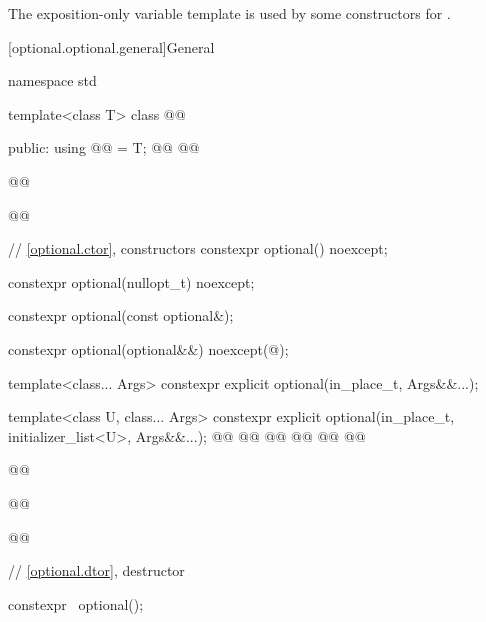 \begin{addedblock}
\pnum
The exposition-only variable template  is used by some constructors for .
\end{addedblock}

[optional.optional.general]{General}

\begin{codeblock}
namespace std {
  template<class T>
  class @@ {
  public:
    using @@ = T;
    @@
    @@

    @@

    @@

    // \ref{optional.ctor}, constructors
    constexpr optional() noexcept;

    constexpr optional(nullopt_t) noexcept;

    constexpr optional(const optional&);

    constexpr optional(optional&&) noexcept(@\seebelow@);

    template<class... Args> constexpr explicit optional(in_place_t, Args&&...);

    template<class U, class... Args>
    constexpr explicit optional(in_place_t, initializer_list<U>, Args&&...);
    @@
      @@
    @@
      @@
    @@
      @@

    @@

    @@

    @@

    // \ref{optional.dtor}, destructor

    constexpr ~optional();

}}
\end{codeblock}
